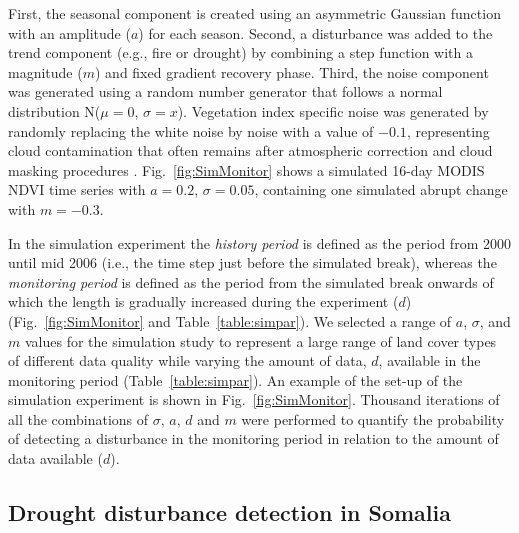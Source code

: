 \documentclass[authoryear,preprint,review,10pt]{elsarticle}
\begin{document}
First, the seasonal component is created using an asymmetric Gaussian function with an amplitude ($a$) for each season. Second, a disturbance was added to the trend component (e.g., fire or drought) by combining a step function with a magnitude ($m$) and fixed gradient recovery phase. Third, the noise component was generated using a random number generator that follows a normal distribution N($\mu = 0$, $\sigma =x$). Vegetation index specific noise was generated by randomly replacing the white noise by noise with a value of $-0.1$, representing cloud contamination that often remains after atmospheric correction and cloud masking procedures \citep[see][for more details]{Verbesselt:2010wo}. Fig.~\ref{fig:SimMonitor} shows a simulated 16-day MODIS NDVI time series with $a = 0.2$, $\sigma = 0.05$, containing one simulated abrupt change with $m = -0.3$.

In the simulation experiment the \emph{history period} is defined as the period from 2000 until mid 2006 (i.e., the time step just before the simulated break), whereas the \emph{monitoring period} is defined as the period from the simulated break onwards of which the length is gradually increased during the experiment ($d$) (Fig.~\ref{fig:SimMonitor} and Table~\ref{table:simpar}). We selected a range of $a$, $\sigma$, and $m$ values for the simulation study to represent a large range of land cover types of different data quality while varying the amount of data, $d$, available in the monitoring period (Table~\ref{table:simpar}). An example of the set-up of the simulation experiment is shown in Fig.~\ref{fig:SimMonitor}. Thousand iterations of all the combinations of $\sigma$, $a$, $d$ and $m$ were performed to quantify the probability of detecting a disturbance in the monitoring period in relation to the amount of data available ($d$).

\subsection{Drought disturbance detection in Somalia}\label{sec:RealData}
\end{document}

